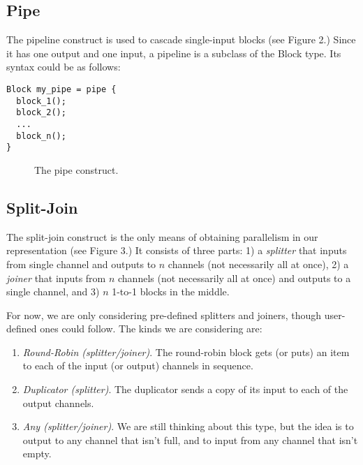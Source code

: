 \subsection{Pipe}

The pipeline construct is used to cascade single-input blocks (see
Figure 2.)  Since it has one output and one input, a pipeline is a
subclass of the Block type. Its syntax could be as follows:

\begin{verbatim}
Block my_pipe = pipe {
  block_1();
  block_2();
  ...
  block_n();
}
\end{verbatim}

\begin{figure}[t]
\centerline{}
\vspace{-24pt}
\caption{\protect\small The pipe construct.}
\end{figure}

\subsection{Split-Join}

The split-join construct is the only means of obtaining parallelism in
our representation (see Figure 3.)  It consists of three parts: 1) a
{\em splitter} that inputs from single channel and outputs to $n$
channels (not necessarily all at once), 2) a {\em joiner} that inputs
from $n$ channels (not necessarily all at once) and outputs to a single
channel, and 3) $n$ 1-to-1 blocks in the middle.

For now, we are only considering pre-defined splitters and joiners,
though user-defined ones could follow.  The kinds we are considering
are:

\begin{enumerate}

\item {\em Round-Robin (splitter/joiner)}.  The round-robin block gets
(or puts) an item to each of the input (or output) channels in sequence.

\item {\em Duplicator (splitter)}.  The duplicator sends a copy of its
input to each of the output channels.

\item {\em Any (splitter/joiner)}.  We are still thinking about this
type, but the idea is to output to any channel that isn't full, and to
input from any channel that isn't empty.

\end{enumerate}

